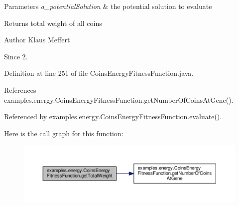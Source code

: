 \begin{DoxyParams}{Parameters}
{\em a\-\_\-potential\-Solution} & the potential solution to evaluate \\
\hline
\end{DoxyParams}
\begin{DoxyReturn}{Returns}
total weight of all coins
\end{DoxyReturn}
\begin{DoxyAuthor}{Author}
Klaus Meffert 
\end{DoxyAuthor}
\begin{DoxySince}{Since}
2. 
\end{DoxySince}


Definition at line 251 of file Coins\-Energy\-Fitness\-Function.\-java.



References examples.\-energy.\-Coins\-Energy\-Fitness\-Function.\-get\-Number\-Of\-Coins\-At\-Gene().



Referenced by examples.\-energy.\-Coins\-Energy\-Fitness\-Function.\-evaluate().



Here is the call graph for this function\-:
\nopagebreak
\begin{figure}[H]
\begin{center}
\leavevmode
\includegraphics[width=350pt]{classexamples_1_1energy_1_1_coins_energy_fitness_function_a784078a27e79464d231c85eed97ae5f2_cgraph}
\end{center}
\end{figure}




